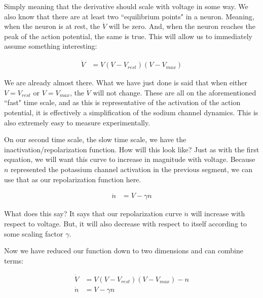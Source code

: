 \documentclass[12pt]{report}
\begin{document}
Simply meaning that the derivative should scale with voltage in some way. We also know that there are at least two ``equilibrium points" in a neuron. Meaning, when the neuron is at rest, the $\dot{V}$ will be zero. And, when the neuron reaches the peak of the action potential, the same is true. This will allow us to immediately assume something interesting:

\begin{equation} \label{eq8}
\begin{split}
\dot{V} &= V(V - V_{rest})(V - V_{max})
\end{split}
\end{equation}

We are already almost there. What we have just done is said that when either $V = V_{rest}$ or $V = V_{max}$, the $\dot{V}$ will not change. These are all on the aforementioned ``fast" time scale, and as this is representative of the activation of the action potential, it is effectively a simplification of the sodium channel dynamics. This is also extremely easy to measure experimentally.\newline

On our second time scale, the slow time scale, we have the inactivation/repolarization function. How will this look like? Just as with the first equation, we will want this curve to increase in magnitude with voltage. Because $n$ represented the potassium channel activation in the previous segment, we can use that as our repolarization function here. 

\begin{equation} \label{eq8}
\begin{split}
\dot{n} &= V - \gamma n
\end{split}
\end{equation}

What does this say? It says that our repolarization curve $\dot{n}$ will increase with respect to voltage. But, it will also decrease with respect to itself according to some scaling factor $\gamma$.\newline

Now we have reduced our function down to two dimensions and can combine terms: 
    
\begin{equation} \label{eq8}
\begin{split}
    \dot{V} &= V(V - V_{rest})(V - V_{max}) - n\\ 
    \dot{n} &= V - \gamma n\\
\end{split}
\end{equation}
\end{document}

